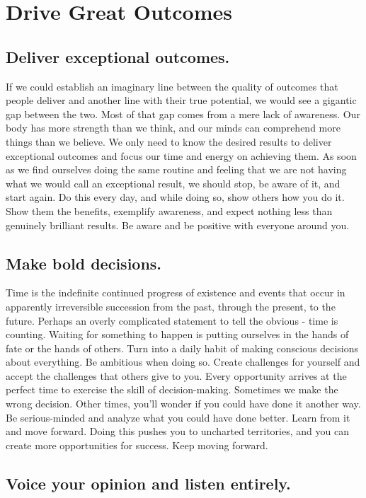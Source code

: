 \documentclass[10pt,a4paper]{book}
\begin{document}
\chapter{Drive Great Outcomes}

\section{Deliver exceptional outcomes.}

If we could establish an imaginary line between the quality of outcomes that people deliver and another line with their true potential, we would see a gigantic gap between the two. Most of that gap comes from a mere lack of awareness. Our body has more strength than we think, and our minds can comprehend more things than we believe. We only need to know the desired results to deliver exceptional outcomes and focus our time and energy on achieving them. As soon as we find ourselves doing the same routine and feeling that we are not having what we would call an exceptional result, we should stop, be aware of it, and start again. Do this every day, and while doing so, show others how you do it. Show them the benefits, exemplify awareness, and expect nothing less than genuinely brilliant results. Be aware and be positive with everyone around you.

\section{Make bold decisions.}

Time is the indefinite continued progress of existence and events that occur in apparently irreversible succession from the past, through the present, to the future. Perhaps an overly complicated statement to tell the obvious - time is counting. Waiting for something to happen is putting ourselves in the hands of fate or the hands of others. Turn into a daily habit of making conscious decisions about everything. Be ambitious when doing so. Create challenges for yourself and accept the challenges that others give to you. Every opportunity arrives at the perfect time to exercise the skill of decision-making. Sometimes we make the wrong decision. Other times, you'll wonder if you could have done it another way. Be serious-minded and analyze what you could have done better. Learn from it and move forward. Doing this pushes you to uncharted territories, and you can create more opportunities for success. Keep moving forward.

\section{Voice your opinion and listen entirely.}
\end{document}
